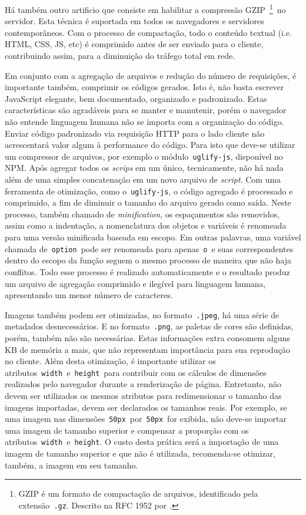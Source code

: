 Há também outro artificio que consiste em habilitar a compressão GZIP~\footnote{GZIP é um formato de compactação de arquivos, identificado pela extensão~\texttt{.gz}. Descrito na RFC 1952 por .}~no servidor. Esta técnica é suportada em todos os navegadores e servidores contemporâneos. Com o processo de compactação, todo o conteúdo textual (i.e. HTML, CSS, JS, etc) é comprimido antes de ser enviado para o cliente, contribuindo assim, para a diminuição do tráfego total em rede.

Em conjunto com a agregação de arquivos e redução do número de requisições, é importante também, comprimir os códigos gerados. Isto é, não basta escrever JavaScript elegante, bem documentado, organizado e padronizado. Estas características são agradáveis para se manter e manutenir, porém o navegador não entende linguagem humana não se importa com a organização do código. Enviar código padronizado via requisição HTTP para o lado cliente não acrescentará valor algum à performance do código. Para isto que deve-se utilizar um compressor de arquivos, por exemplo o módulo~\texttt{uglify-js}, disponível no NPM. Após agregar todos os \textit{scrips} em um único, tecnicamente, não há nada além de uma simples concatenação em um novo arquivo de \textit{script}. Com uma ferramenta de otimização, como o~\texttt{uglify-js}, o código agregado é processado e comprimido, a fim de diminuir o tamanho do arquivo gerado como saída. Neste processo, também chamado de \textit{minification}, os espaçamentos são removidos, assim como a indentação, a nomenclatura dos objetos e variáveis é renomeada para uma versão minificada baseada em escopo. Em outras palavras, uma variável chamada de~\texttt{option}~pode ser renomeada para apenas~\texttt{o}~e suas correspondentes dentro do escopo da função seguem o mesmo processo de maneira que não haja conflitos. Todo esse processo é realizado automaticamente e o resultado produz um arquivo de agregação comprimido e ilegível para linguagem humana, apresentando um menor número de caracteres.

Imagens também podem ser otimizadas, no formato~\texttt{.jpeg}, há uma série de metadados desnecessários. E no formato~\texttt{.png}, as paletas de cores são definidas, porém, também não são necessárias. Estas informações extra consomem alguns KB de memória a mais, que não representam importância para sua reprodução no cliente. Além desta otimização, é importante utilizar os atributos~\texttt{width}~e~\texttt{height}~para contribuir com os cálculos de dimensões realizados pelo navegador durante a renderização de página. Entretanto, não devem ser utilizados os mesmos atributos para redimensionar o tamanho das imagens importadas, devem ser declarados os tamanhos reais. Por exemplo, se uma imagem nas dimensões~\texttt{50px}~por~\texttt{50px}~for exibida, não deve-se importar uma imagem de tamanho superior e compensar a proporção com os atributos~\texttt{width}~e~\texttt{height}. O custo desta prática será a importação de uma imagem de tamanho superior e que não é utilizada, recomenda-se otimizar, também, a imagem em seu tamanho.